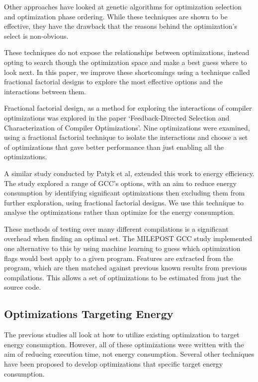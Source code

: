 \documentclass[twocolumn]{article}
\begin{document}
Other approaches have looked at genetic algorithms for optimization selection\cite{Lin2008} and optimization phase ordering\cite{Almagor2004}. While these techniques are shown to be effective, they have the drawback that the reasons behind the optimization's select is non-obvious.

These techniques do not expose the relationships between optimizations, instead opting to search though the optimization space and make a best guess where to look next. In this paper, we improve these shortcomings using a technique called fractional factorial designs\cite{BoxHunter} to explore the most effective options and the interactions between them.

Fractional factorial design, as a method for exploring the interactions of compiler optimizations was explored in the paper `Feedback-Directed Selection and Characterization of Compiler Optimizations'\cite{IntelPaper}. Nine optimizations were examined, using a fractional factorial technique to isolate the interactions and choose a set of optimizations that gave better performance than just enabling all the optimizations.

A similar study conducted by Patyk et al\cite{EnergyReductionCompilerOptions}, extended this work to energy efficiency. The study explored a range of GCC's options, with an aim to reduce energy consumption by identifying significant optimizations then excluding them from further exploration, using fractional factorial designs. We use this technique to analyse the optimizations rather than optimize for the energy consumption.

These methods of testing over many different compilations is a significant overhead when finding an optimal set. The MILEPOST GCC\cite{Fursin2011} study implemented one alternative to this by using machine learning to guess which optimization flags would best apply to a given program. Features are extracted from the program, which are then matched against previous known results from previous compilations. This allows a set of optimizations to be estimated from just the source code.

\subsection{Optimizations Targeting Energy}

The previous studies all look at how to utilize existing optimization to target energy consumption. However, all of these optimizations were written with the aim of reducing execution time, not energy consumption. Several other techniques have been proposed to develop optimizations that specific target energy consumption.
\end{document}
